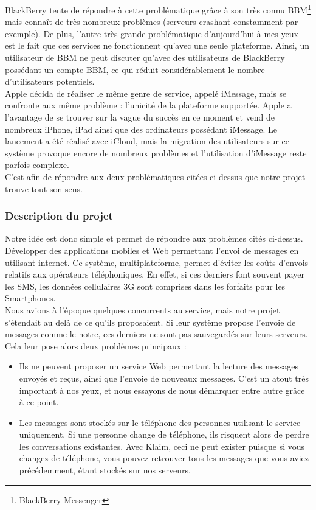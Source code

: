 \documentclass{article}
\begin{document}
	BlackBerry tente de répondre à cette problématique grâce à son très connu BBM\footnote{BlackBerry Messenger} mais connaît de très nombreux problèmes (serveurs crashant constamment par exemple). De plus, l’autre très grande problématique d’aujourd’hui à mes yeux est le fait que ces services ne fonctionnent qu’avec une seule plateforme. Ainsi, un utilisateur de BBM ne peut discuter qu’avec des utilisateurs de BlackBerry possédant un compte BBM, ce qui réduit considérablement le nombre d'utilisateurs potentiels. \\
	
	Apple décida de réaliser le même genre de service, appelé iMessage, mais se confronte aux même problème : l’unicité de la plateforme supportée. Apple a l'avantage de se trouver sur la vague du succès en ce moment et vend de nombreux iPhone, iPad ainsi que des ordinateurs possédant iMessage. Le lancement a été réalisé avec iCloud, mais la migration des utilisateurs sur ce système provoque encore de nombreux problèmes et l'utilisation d'iMessage reste parfois complexe.\\
	
	C’est afin de répondre aux deux problématiques citées ci-dessus que notre projet trouve tout son sens.

\subsubsection{Description du projet}
	Notre idée est donc simple et permet de répondre aux problèmes cités ci-dessus. Développer des applications mobiles et Web permettant l’envoi de messages en utilisant internet. Ce système, multiplateforme, permet d’éviter les coûts d’envois relatifs aux opérateurs téléphoniques. En effet, si ces derniers font souvent payer les SMS, les données cellulaires 3G sont comprises dans les forfaits pour les Smartphones.\\
	
	Nous avions à l’époque quelques concurrents au service, mais notre projet s’étendait au delà de ce qu’ils proposaient. Si leur système propose l’envoie de messages comme le notre, ces derniers ne sont pas sauvegardés sur leurs serveurs. Cela leur pose alors deux problèmes principaux :
	\begin{itemize}
		\item Ils ne peuvent proposer un service Web permettant la lecture des messages envoyés et reçus, ainsi que l’envoie de nouveaux messages. C'est un atout très important à nos yeux, et nous essayons de nous démarquer entre autre grâce à ce point.
		\item Les messages sont stockés sur le téléphone des personnes utilisant le service uniquement. Si une personne change de téléphone, ils risquent alors de perdre les conversations existantes. Avec Klaim, ceci ne peut exister puisque si vous changez de téléphone, vous pouvez retrouver tous les messages que vous aviez précédemment, étant stockés sur nos serveurs.
	\end{itemize}
\end{document}
